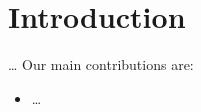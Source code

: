 \chapter{Introduction}\label{sec:introduction}

\ldots{}
Our main contributions are:
\begin{itemize}
    \item \ldots{}
\end{itemize}